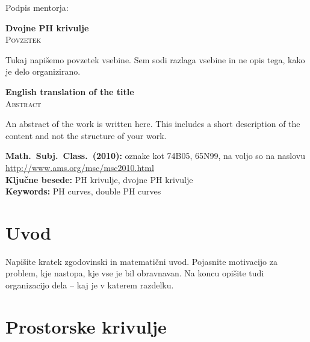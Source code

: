 \documentclass[12pt,a4paper,twoside]{article}
\newcommand{\naslovdela}{Dvojne PH krivulje}
\newcommand{\kljucnebesede}{PH krivulje\sep dvojne PH krivulje} %
\newcommand{\keywords}{PH curves\sep double PH curves} %
\newcommand{\sep}{, }  %
\theoremstyle{definition} %
\theoremstyle{plain} %
\numberwithin{equation}{section}  %
\begin{document}
\vspace{2cm}
\hspace*{\fill} Podpis mentorja: \phantom{prostor za podpis}


\cleardoublepage
{}

\begin{center}
\textbf{\naslovdela} \\[3mm]
\textsc{Povzetek} \\[2mm]
\end{center}
Tukaj napišemo povzetek vsebine. Sem sodi razlaga vsebine in ne opis tega, kako je delo
organizirano.

\vfill
\begin{center}
\textbf{English translation of the title} \\[3mm] %
\textsc{Abstract}\\[2mm]
\end{center}

An abstract of the work is written here. This includes a short description of
the content and not the structure of your work.

\vfill\noindent
\textbf{Math.~Subj.~Class.~(2010):} oznake kot 74B05, 65N99, na voljo so na naslovu
\url{http://www.ams.org/msc/msc2010.html} \\[1mm]
\textbf{Ključne besede:} \kljucnebesede \\[1mm]
\textbf{Keywords:} \keywords

\cleardoublepage

\setcounter{page}{1}    %

\section{Uvod}

Napišite kratek zgodovinski in matematični uvod.  Pojasnite motivacijo za problem, kje
nastopa, kje vse je bil obravnavan. Na koncu opišite tudi organizacijo dela -- kaj je v
katerem razdelku.
\section{Prostorske krivulje}
\end{document}
